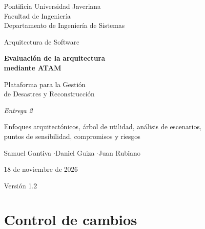\documentclass[11pt,letterpaper]{article}
\begin{document}
\begin{titlepage}
\centering
\vspace*{2.2cm}
{\large Pontificia Universidad Javeriana\\ Facultad de Ingeniería\\ Departamento de Ingeniería de Sistemas\par}
\vspace{0.4cm}
{\large Arquitectura de Software\par}
\vspace{2.2cm}
{\Huge\bfseries Evaluación de la arquitectura\\[3mm] mediante ATAM\par}
\vspace{1.0cm}
{\LARGE Plataforma para la Gestión\\[2mm] de Desastres y Reconstrucción\par}
\vspace{1.6cm}
{\large\itshape Entrega 2\par}
{\large Enfoques arquitectónicos, árbol de utilidad, análisis de escenarios,\\ puntos de sensibilidad, compromisos y riesgos\par}
\vspace{2.2cm}
{\large Samuel Gantiva \quad$\cdot$\quad Daniel Guiza \quad$\cdot$\quad Juan Rubiano\par}
\vspace{1.2cm}
{\large 18 de noviembre de 2026\par}
\vfill
{\small Versión 1.2\par}
\end{titlepage}

\section*{Control de cambios}
\end{document}
